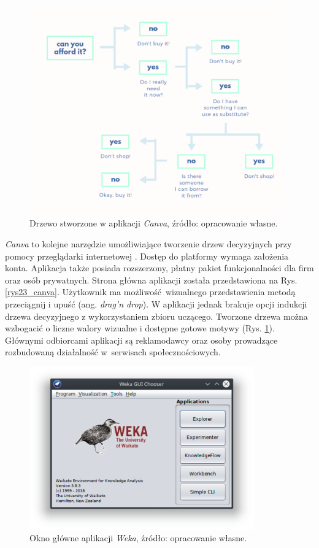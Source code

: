 \begin{figure}[htb]
	\centering
	\includegraphics[width=11cm]{grafika/canvas_tree.eps}
	\caption{Drzewo stworzone w aplikacji \textit{Canva}, źródło: opracowanie własne.}
	\label{rys24_canva_tree}
\end{figure}

\textit{Canva} to kolejne narzędzie umożliwiające tworzenie drzew decyzyjnych przy pomocy przeglądarki internetowej \cite{misc_canva}. Dostęp do platformy wymaga założenia konta. Aplikacja także posiada rozszerzony, płatny pakiet funkcjonalności dla firm oraz osób prywatnych. Strona główna aplikacji została przedstawiona na Rys. \ref{rys23_canva}. Użytkownik ma możliwość wizualnego przedstawienia metodą przeciągnij i upuść (ang. \textit{drag'n drop}). W aplikacji jednak brakuje opcji indukcji drzewa decyzyjnego z wykorzystaniem zbioru uczącego. Tworzone drzewa można wzbogacić o liczne walory wizualne i dostępne gotowe motywy (Rys. \ref{rys24_canva_tree}). Głównymi odbiorcami aplikacji są reklamodawcy oraz osoby prowadzące rozbudowaną działalność w~serwisach społecznościowych. 
 
\begin{figure}[htb]
	\centering
	\includegraphics[height=7cm]{grafika/weka.eps}
	\caption{Okno główne aplikacji \textit{Weka}, źródło: opracowanie własne.}
	\label{rys25_weka}
\end{figure}

